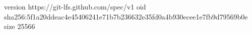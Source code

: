 version https://git-lfs.github.com/spec/v1
oid sha256:5f1a20ddeac4e45406241e71b7b236632e35fd0a4b930ecee1e7fb9d79569b0e
size 25566
